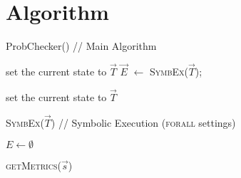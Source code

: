 \section{Algorithm}
\label{sec:algorithm}


\begin{algorithm}
	\caption{ProbChecker() // Main Algorithm}
	\label{alg:pse_ext}
	\SetAlgoLined
	\small
	set the current state to $\vec{T}$\;
	$\vec{E}$ $\gets$ \textsc{SymbEx($\vec{T}$)}; \\
\end{algorithm}

\begin{algorithm}
	\label{alg:symb_ex}
	\SetAlgoLined
	\small
	set the current state to $\vec{T}$\;
	\caption{\textsc{SymbEx}($\vec{T}$) // Symbolic Execution (\textsc{forall} settings)}
\end{algorithm}

\begin{algorithm}[t]
	\SetAlgoLined
	\small
	$E \gets \emptyset$\;
	\caption{\textsc{getMetrics}({$\vec{s}$})}
	\label{alg:almostverify}
\end{algorithm}